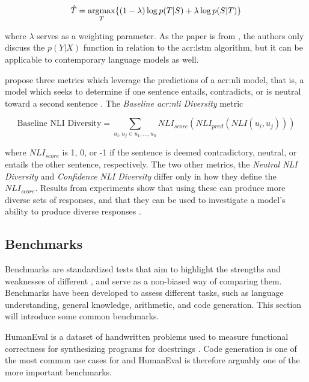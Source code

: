 \begin{equation}
    \hat{T} = \operatorname*{argmax}_{T} \{ (1 - \lambda) \log p(T|S) + \lambda \log p(S|T) \}
\end{equation}

\noindent where $\lambda$ serves as a weighting parameter. As the paper is from \citeyear{liDiversityPromotingObjectiveFunction2016}, the authors only discuss the $p(Y|X)$ function in relation to the \gls{acr:lstm} algorithm, but it can be applicable to contemporary language models as well.

\cite{stasaskiSemanticDiversityDialogue2022} propose three metrics which leverage the predictions of a \gls{acr:nli} model, that is, a model which seeks to determine if one sentence entails, contradicts, or is neutral toward a second  sentence \citep[1]{stasaskiSemanticDiversityDialogue2022}. The \textit{Baseline \acrshort{acr:nli} Diversity} metric

\begin{equation}
    \text{Baseline NLI Diversity} = \sum_{u_i,u_j \in u_1,...,u_n} NLI_{score}(NLI_{pred}(NLI(u_i, u_j)))
\end{equation}

where $NLI_{score}$ is 1, 0, or -1 if the sentence is deemed contradictory, neutral, or entails the other sentence, respectively. The two other metrics, the \textit{Neutral NLI Diversity} and \textit{Confidence NLI Diversity} differ only in how they define the $NLI_{score}$. Results from experiments show that using these can produce more diverse sets of responses, and that they can be used to investigate a model's ability to produce diverse responses \citep[9]{stasaskiSemanticDiversityDialogue2022}.

\subsection{Benchmarks}\label{subsec:benchmarks}

Benchmarks are standardized tests that aim to highlight the strengths and weaknesses of different , and serve as a non-biased way of comparing them. Benchmarks have been developed to assess different tasks, such as language understanding, general knowledge, arithmetic, and code generation. This section will introduce some common benchmarks.

HumanEval is a dataset of handwritten problems used to measure functional correctness for synthesizing programs for docstrings \citep[2-4]{chenEvaluatingLargeLanguage2021}. Code generation is one of the most common use cases for  and HumanEval is therefore arguably one of the more important benchmarks.

